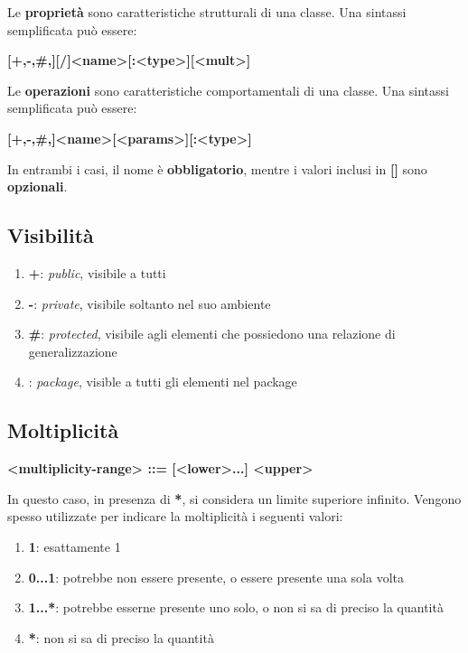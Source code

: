 \documentclass{article}
\begin{document}
Le \textbf{proprietà} sono caratteristiche strutturali di una classe. Una sintassi semplificata può essere:
\begin{center}
    \textbf{[+,-,\#,\texttildelow][/]<name>[:<type>][<mult>]}
\end{center}
Le \textbf{operazioni} sono caratteristiche comportamentali di una classe. Una sintassi semplificata può essere:
\begin{center}
    \textbf{[+,-,\#,\texttildelow]<name>[<params>][:<type>]}
\end{center}
In entrambi i casi, il nome è \textbf{obbligatorio}, mentre i valori inclusi in \textbf{[]} sono \textbf{opzionali}.

\subsection*{Visibilità}
\large
\begin{enumerate}
    \renewcommand{\labelenumi}{-}
    \item \textbf{+}: \textit{public}, visibile a tutti
    \item \textbf{-}: \textit{private}, visibile soltanto nel suo ambiente
    \item \textbf{\#}: \textit{protected}, visibile agli elementi che possiedono una relazione di generalizzazione
    \item \textbf{\texttildelow}: \textit{package}, visible a tutti gli elementi nel package
\end{enumerate}

\subsection*{Moltiplicità}
\large
\begin{center}
    \textbf{<multiplicity-range> ::= [<lower>...] <upper>}
\end{center}
In questo caso, in presenza di \textbf{*}, si considera un limite superiore infinito. Vengono spesso utilizzate per indicare la moltiplicità i seguenti valori:
\begin{enumerate}
    \renewcommand{\labelenumi}{-}
    \item \textbf{1}: esattamente 1
    \item \textbf{0...1}: potrebbe non essere presente, o essere presente una sola volta
    \item \textbf{1...*}: potrebbe esserne presente uno solo, o non si sa di preciso la quantità
    \item \textbf{*}: non si sa di preciso la quantità
\end{enumerate}
\end{document}
